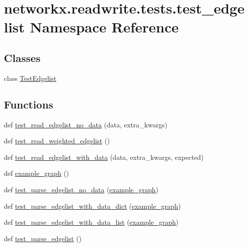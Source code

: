 \hypertarget{namespacenetworkx_1_1readwrite_1_1tests_1_1test__edgelist}{}\section{networkx.\+readwrite.\+tests.\+test\+\_\+edgelist Namespace Reference}
\label{namespacenetworkx_1_1readwrite_1_1tests_1_1test__edgelist}
\subsection*{Classes}
\begin{DoxyCompactItemize}
\item 
class \hyperlink{classnetworkx_1_1readwrite_1_1tests_1_1test__edgelist_1_1TestEdgelist}{Test\+Edgelist}
\end{DoxyCompactItemize}
\subsection*{Functions}
\begin{DoxyCompactItemize}
\item 
def \hyperlink{namespacenetworkx_1_1readwrite_1_1tests_1_1test__edgelist_af60ce5fadfe47c013b9b43ced86e69a1}{test\+\_\+read\+\_\+edgelist\+\_\+no\+\_\+data} (data, extra\+\_\+kwargs)
\item 
def \hyperlink{namespacenetworkx_1_1readwrite_1_1tests_1_1test__edgelist_abf1286dd967993c77c19a9c891ad47c3}{test\+\_\+read\+\_\+weighted\+\_\+edgelist} ()
\item 
def \hyperlink{namespacenetworkx_1_1readwrite_1_1tests_1_1test__edgelist_a5a47e6dc375c71c5c56d6fc43043a608}{test\+\_\+read\+\_\+edgelist\+\_\+with\+\_\+data} (data, extra\+\_\+kwargs, expected)
\item 
def \hyperlink{namespacenetworkx_1_1readwrite_1_1tests_1_1test__edgelist_ac79f13c939b3b5a7fff3732364cdff29}{example\+\_\+graph} ()
\item 
def \hyperlink{namespacenetworkx_1_1readwrite_1_1tests_1_1test__edgelist_a9df24427554181bf211f3134ff9a4c49}{test\+\_\+parse\+\_\+edgelist\+\_\+no\+\_\+data} (\hyperlink{namespacenetworkx_1_1readwrite_1_1tests_1_1test__edgelist_ac79f13c939b3b5a7fff3732364cdff29}{example\+\_\+graph})
\item 
def \hyperlink{namespacenetworkx_1_1readwrite_1_1tests_1_1test__edgelist_aa5b85f0475263ebf2c1e9b2fa75e6ccf}{test\+\_\+parse\+\_\+edgelist\+\_\+with\+\_\+data\+\_\+dict} (\hyperlink{namespacenetworkx_1_1readwrite_1_1tests_1_1test__edgelist_ac79f13c939b3b5a7fff3732364cdff29}{example\+\_\+graph})
\item 
def \hyperlink{namespacenetworkx_1_1readwrite_1_1tests_1_1test__edgelist_a000e49548b20d053ad4e4c578972c2d4}{test\+\_\+parse\+\_\+edgelist\+\_\+with\+\_\+data\+\_\+list} (\hyperlink{namespacenetworkx_1_1readwrite_1_1tests_1_1test__edgelist_ac79f13c939b3b5a7fff3732364cdff29}{example\+\_\+graph})
\item 
def \hyperlink{namespacenetworkx_1_1readwrite_1_1tests_1_1test__edgelist_a53dee77292ed500bda2cc3ec52d6be49}{test\+\_\+parse\+\_\+edgelist} ()
\end{DoxyCompactItemize}
